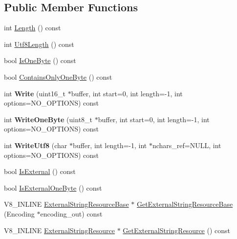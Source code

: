\subsection*{Public Member Functions}
\begin{DoxyCompactItemize}
\item 
int \mbox{\hyperlink{classv8_1_1String_afaa18eae27056bb7058f09920a238f53}{Length}} () const
\item 
int \mbox{\hyperlink{classv8_1_1String_a03010150464f91fdabb73c837bf41706}{Utf8\+Length}} () const
\item 
bool \mbox{\hyperlink{classv8_1_1String_a8f14ab3aff52295d2d3245081a1b29eb}{Is\+One\+Byte}} () const
\item 
bool \mbox{\hyperlink{classv8_1_1String_a29b9bc5f71fba74af478e806b9d6a1d6}{Contains\+Only\+One\+Byte}} () const
\item 
\mbox{\label{classv8_1_1String_a4377d4256329aa83b60dbe6ec2724d2b}} 
int {\bfseries Write} (uint16\+\_\+t $\ast$buffer, int start=0, int length=-\/1, int options=N\+O\+\_\+\+O\+P\+T\+I\+O\+NS) const
\item 
\mbox{\label{classv8_1_1String_a2341e5b5fb4a2ca8c7167cd8f61159c5}} 
int {\bfseries Write\+One\+Byte} (uint8\+\_\+t $\ast$buffer, int start=0, int length=-\/1, int options=N\+O\+\_\+\+O\+P\+T\+I\+O\+NS) const
\item 
\mbox{\label{classv8_1_1String_aa2529bf836fe251638ebc0a014c1a19c}} 
int {\bfseries Write\+Utf8} (char $\ast$buffer, int length=-\/1, int $\ast$nchars\+\_\+ref=N\+U\+LL, int options=N\+O\+\_\+\+O\+P\+T\+I\+O\+NS) const
\item 
bool \mbox{\hyperlink{classv8_1_1String_a1d24faa97c6168221ec362c395d41ce1}{Is\+External}} () const
\item 
bool \mbox{\hyperlink{classv8_1_1String_a29b5d1786d906b84e10a5cab9451f976}{Is\+External\+One\+Byte}} () const
\item 
V8\+\_\+\+I\+N\+L\+I\+NE \mbox{\hyperlink{classv8_1_1String_1_1ExternalStringResourceBase}{External\+String\+Resource\+Base}} $\ast$ \mbox{\hyperlink{classv8_1_1String_a3031c6406f3f84bbc2d9810477a07489}{Get\+External\+String\+Resource\+Base}} (Encoding $\ast$encoding\+\_\+out) const
\item 
V8\+\_\+\+I\+N\+L\+I\+NE \mbox{\hyperlink{classv8_1_1String_1_1ExternalStringResource}{External\+String\+Resource}} $\ast$ \mbox{\hyperlink{classv8_1_1String_ac751c8c239eb213a879204cab6787883}{Get\+External\+String\+Resource}} () const

\end{DoxyCompactItemize}
